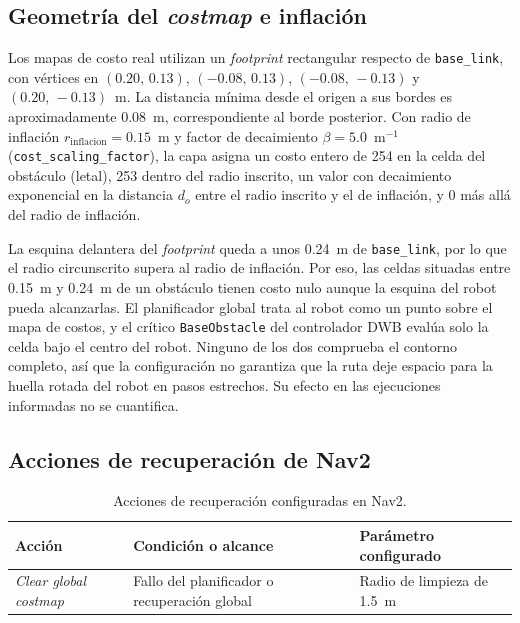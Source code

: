 \begin{appendices}
\subsection{Geometría del \texorpdfstring{\textit{costmap}}{costmap} e inflación}
\label{anx:costmap_inflacion}

Los mapas de costo real utilizan un \textit{footprint} rectangular respecto de \texttt{base\_link}, con vértices en $(0.20,\,0.13)$, $(-0.08,\,0.13)$, $(-0.08,\,-0.13)$ y $(0.20,\,-0.13)$~m. La distancia mínima desde el origen a sus bordes es aproximadamente 0.08~m, correspondiente al borde posterior. Con radio de inflación $r_{\mathrm{inflacion}}=0.15$~m y factor de decaimiento $\beta=5.0$~m$^{-1}$ (\texttt{cost\_scaling\_factor}), la capa asigna un costo entero de 254 en la celda del obstáculo (letal), 253 dentro del radio inscrito, un valor con decaimiento exponencial en la distancia $d_o$ entre el radio inscrito y el de inflación, y 0 más allá del radio de inflación.

La esquina delantera del \textit{footprint} queda a unos 0.24~m de
\texttt{base\_link}, por lo que el radio circunscrito supera al radio de
inflación. Por eso, las celdas situadas entre 0.15~m y 0.24~m de un obstáculo
tienen costo nulo aunque la esquina del robot pueda alcanzarlas. El
planificador global trata al robot como un punto sobre el mapa de costos, y el
crítico \texttt{BaseObstacle} del controlador DWB evalúa solo la celda bajo el
centro del robot. Ninguno de los dos comprueba el contorno completo, así que la
configuración no garantiza que la ruta deje espacio para la huella rotada del
robot en pasos estrechos. Su efecto en las ejecuciones informadas no se
cuantifica.

\subsection{Acciones de recuperación de Nav2}
\label{anx:recovery_nav2}

\begin{table}[H]
\centering
\caption{Acciones de recuperación configuradas en Nav2.}
\label{tab:recovery_ch9}
\small
\begin{tabular}{p{3.6cm} p{4.8cm} p{5.2cm}}
\toprule
\textbf{Acción} &
\textbf{Condición o alcance} &
\textbf{Parámetro configurado} \\
\midrule
\textit{Clear global costmap} &
Fallo del planificador o recuperación global &
Radio de limpieza de 1.5~m \\


\end{tabular}
\end{table}
\end{appendices}
